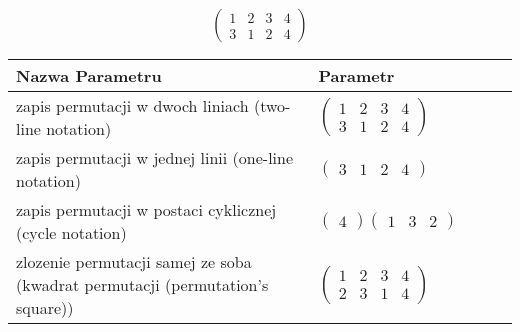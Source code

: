 \documentclass[12pt]{article}
\begin{document}
\subsection{}
\begin{center}
\[
\begin{pmatrix}
	1 & 2 & 3 & 4 \\ 
	3 & 1 & 2 & 4 
\end{pmatrix}
\]

\begin{tabular}{|m{0.6\linewidth}|m{0.4\linewidth}|}
	\hline
	Nazwa Parametru & Parametr \\
	\hline
	zapis permutacji w dwoch liniach (two-line notation) & $\begin{pmatrix} 1 & 2 & 3 & 4 \\ 
3 & 1 & 2 & 4 \end{pmatrix}$ \\ 
	\hline
	zapis permutacji w jednej linii (one-line notation) & $\begin{pmatrix} 3 & 1 & 2 & 4 \end{pmatrix}$ \\ 
	\hline
	zapis permutacji w postaci cyklicznej (cycle notation) & $\begin{pmatrix} 4 \end{pmatrix} \begin{pmatrix} 1 & 3 & 2 \end{pmatrix} $ \\ 
	\hline
	zlozenie permutacji samej ze soba (kwadrat permutacji (permutation's square)) & $\begin{pmatrix} 1 & 2 & 3 & 4 \\ 
2 & 3 & 1 & 4 \end{pmatrix}$ \\ 
	\hline
\end{tabular}
\end{center}
\end{document}
